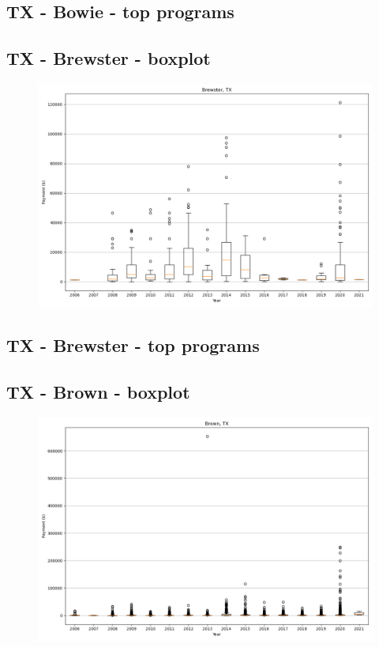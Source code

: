 \subsection*{TX - Bowie - top programs}

\newpage
\subsection*{TX - Brewster - boxplot}
\begin{figure}[h]
\centering
\includegraphics[width=7in]{../output/boxplots/counties/Brewster-TX_boxplot.png}
\end{figure}


\subsection*{TX - Brewster - top programs}

\newpage
\subsection*{TX - Brown - boxplot}
\begin{figure}[h]
\centering
\includegraphics[width=7in]{../output/boxplots/counties/Brown-TX_boxplot.png}
\end{figure}


